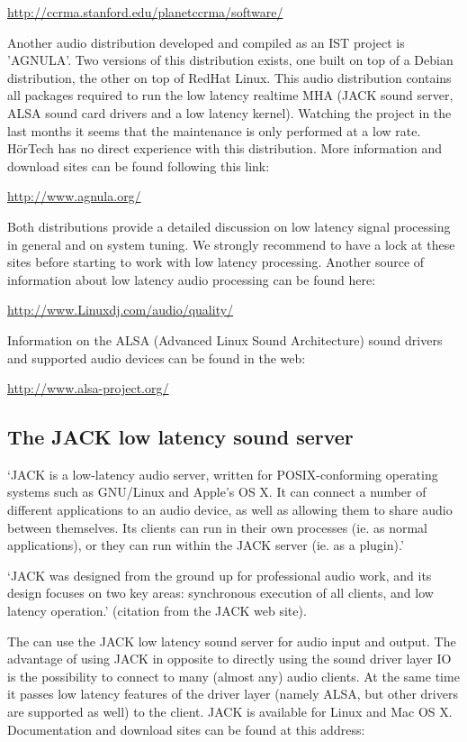\url{http://ccrma.stanford.edu/planetccrma/software/}

Another audio distribution developed and compiled as an IST project
is 'AGNULA'. Two versions of this distribution exists, one built on
top of a Debian distribution, the other on top of RedHat Linux. This
audio distribution contains all packages required to run the low
latency realtime MHA (JACK sound server, ALSA sound card drivers and a
low latency kernel). Watching the project in the last months it seems
that the maintenance is only performed at a low rate. H\"orTech has no
direct experience with this distribution. More information and
download sites can be found following this link:

\url{http://www.agnula.org/}

Both distributions provide a detailed discussion on low latency signal
processing in general and on system tuning. We strongly recommend to
have a lock at these sites before starting to work with low latency
processing. Another source of information about low latency audio
processing can be found here:

\url{http://www.Linuxdj.com/audio/quality/}

Information on the ALSA (Advanced Linux Sound Architecture) sound
drivers and supported audio devices can be found in the web:

\url{http://www.alsa-project.org/}


\subsection{The JACK low latency sound server}
\label{sec:jack}

`JACK is a low-latency audio server, written for POSIX-conforming
operating systems such as GNU/Linux and Apple's OS X. It can connect a
number of different applications to an audio device, as well as
allowing them to share audio between themselves. Its clients can run
in their own processes (ie. as normal applications), or they can run
within the JACK server (ie. as a plugin).'

`JACK was designed from the ground up for professional audio work, and
its design focuses on two key areas: synchronous execution of all
clients, and low latency operation.' (citation from the JACK web site).

The \mhad{} can use the JACK low latency sound
server for audio input and output.
%
The advantage of using JACK in opposite to directly using the sound
driver layer IO is the possibility to connect to many (almost any)
audio clients.
%
At the same time it passes low latency features of the driver layer
(namely ALSA, but other drivers are supported as well) to the client.
%
JACK is available for Linux and Mac OS X. Documentation and download
sites can be found at this address:

